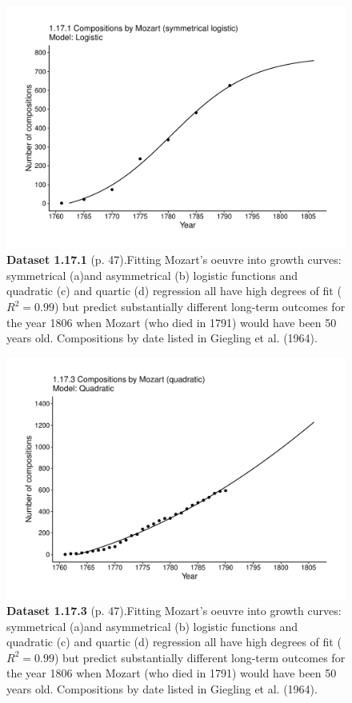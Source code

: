 \documentclass[aps,rmp,preprint,superscriptaddress,10pt,onecolumn]{article}
\begin{document}
\clearpage
\begin{figure}[h]
\includegraphics[width=\textwidth]{output/figs-ggplot/1.17.1.pdf}
\caption*{\textbf{Dataset 1.17.1} (p. 47).Fitting Mozart's oeuvre into growth curves: symmetrical (a)and asymmetrical (b) logistic functions and quadratic (c) and quartic (d) regression all have high degrees of fit ($R^2=0.99$) but predict substantially different long-term outcomes for the year 1806 when Mozart (who died in 1791) would have been 50 years old. Compositions by date listed in Giegling et al. (1964).}
\end{figure}
	
\clearpage
\begin{figure}[h]
\includegraphics[width=\textwidth]{output/figs-ggplot/1.17.3.pdf}
\caption*{\textbf{Dataset 1.17.3} (p. 47).Fitting Mozart's oeuvre into growth curves: symmetrical (a)and asymmetrical (b) logistic functions and quadratic (c) and quartic (d) regression all have high degrees of fit ($R^2=0.99$) but predict substantially different long-term outcomes for the year 1806 when Mozart (who died in 1791) would have been 50 years old. Compositions by date listed in Giegling et al. (1964).}
\end{figure}
	
\end{document}
